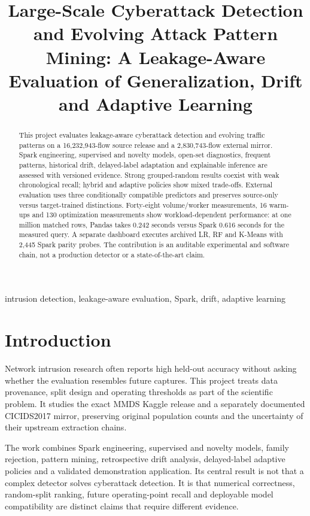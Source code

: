 \documentclass[conference]{IEEEtran}
\title{Large-Scale Cyberattack Detection and Evolving Attack Pattern Mining: A Leakage-Aware Evaluation of Generalization, Drift and Adaptive Learning}
\author{\IEEEauthorblockN{[EDIT STUDENT NAME]}\IEEEauthorblockA{[EDIT DEPARTMENT AND INSTITUTION]\\{}[EDIT CITY, COUNTRY AND EMAIL]}}
\begin{document}
\maketitle
\begin{abstract}This project evaluates leakage-aware cyberattack detection and evolving traffic patterns on a 16,232,943-flow source release and a 2,830,743-flow external mirror. Spark engineering, supervised and novelty models, open-set diagnostics, frequent patterns, historical drift, delayed-label adaptation and explainable inference are assessed with versioned evidence. Strong grouped-random results coexist with weak chronological recall; hybrid and adaptive policies show mixed trade-offs. External evaluation uses three conditionally compatible predictors and preserves source-only versus target-trained distinctions. Forty-eight volume/worker measurements, 16 warm-ups and 130 optimization measurements show workload-dependent performance: at one million matched rows, Pandas takes 0.242 seconds versus Spark 0.616 seconds for the measured query. A separate dashboard executes archived LR, RF and K-Means with 2,445 Spark parity probes. The contribution is an auditable experimental and software chain, not a production detector or a state-of-the-art claim.\end{abstract}
\begin{IEEEkeywords}intrusion detection, leakage-aware evaluation, Spark, drift, adaptive learning\end{IEEEkeywords}
\section{Introduction}
Network intrusion research often reports high held-out accuracy without asking whether the evaluation resembles future captures. This project treats data provenance, split design and operating thresholds as part of the scientific problem. It studies the exact MMDS Kaggle release and a separately documented CICIDS2017 mirror, preserving original population counts and the uncertainty of their upstream extraction chains.

The work combines Spark engineering, supervised and novelty models, family rejection, pattern mining, retrospective drift analysis, delayed-label adaptive policies and a validated demonstration application. Its central result is not that a complex detector solves cyberattack detection. It is that numerical correctness, random-split ranking, future operating-point recall and deployable model compatibility are distinct claims that require different evidence.
\end{document}
